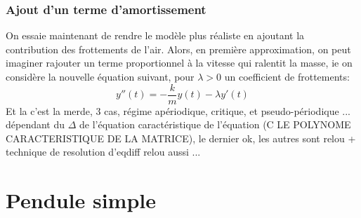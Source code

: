\documentclass{report}
\begin{document}
      \subsection{Ajout d'un terme d'amortissement}
         On essaie maintenant de rendre le modèle plus réaliste en ajoutant la contribution des frottements de l'air. Alors, en première approximation, on peut imaginer rajouter un terme proportionnel à la vitesse qui ralentit la masse, ie on considère la nouvelle équation suivant, pour \(\lambda > 0\) un coefficient de frottements:
         \[
            y''(t) = -\frac{k}{m}y(t) - \lambda y'(t)
         \]
         Et la c'est la merde, 3 cas, régime apériodique, critique, et pseudo-périodique ... dépendant du \(\Delta\) de l'équation caractéristique de l'équation (C LE POLYNOME CARACTERISTIQUE DE LA MATRICE), le dernier ok, les autres sont relou + technique de resolution d'eqdiff relou aussi ... 

   \chapter{Pendule simple}
\end{document}

